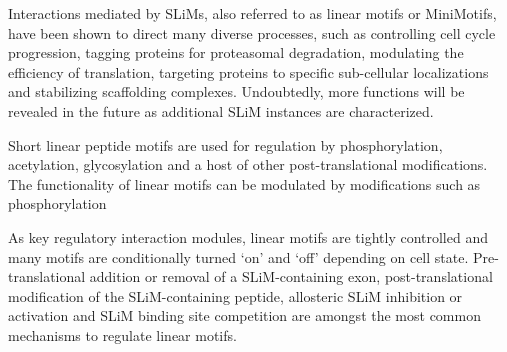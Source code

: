 % 



Interactions mediated by SLiMs, also referred to as linear motifs or MiniMotifs, have been shown to direct many diverse processes, such as controlling cell cycle progression, 
tagging proteins for proteasomal degradation, modulating the efficiency of translation, targeting proteins to specific sub-cellular localizations and stabilizing scaffolding complexes.
Undoubtedly, more functions will be revealed in the future as additional SLiM instances are characterized.

Short linear peptide motifs are used for regulation by phosphorylation, acetylation, glycosylation and a host of other post-translational modifications.
The functionality of linear motifs can be modulated by modifications such as phosphorylation

As key regulatory interaction modules, linear motifs are tightly controlled and many motifs are conditionally turned ‘on’ and ‘off’ depending on cell state. Pre-translational addition or removal of a SLiM-containing exon,
post-translational modification of the SLiM-containing peptide, allosteric SLiM inhibition or activation and SLiM binding site competition are amongst the most common mechanisms to regulate linear motifs.



